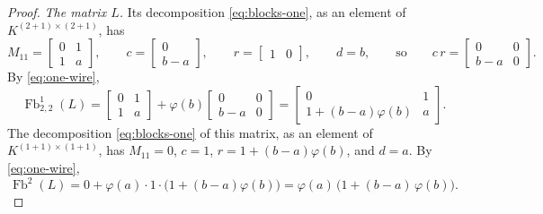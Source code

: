 \documentclass[11pt,a4paper]{article}
\theoremstyle{plain}
\theoremstyle{definition}
\theoremstyle{remark}
\DeclareMathOperator{\Fb}{Fb}
\begin{document}
\begin{proof}
    \emph{The matrix $L$.}
    Its decomposition \cref{eq:blocks-one}, as an element of $K^{(2+1) \times (2+1)}$, has
    \begin{equation*}
        M_{11} = \begin{bmatrix} 0 & 1 \\ 1 & a \end{bmatrix},
        \qquad
        c = \begin{bmatrix} 0 \\ b - a \end{bmatrix},
        \qquad
        r = \begin{bmatrix} 1 & 0 \end{bmatrix},
        \qquad
        d = b,
        \qquad \text{so} \qquad
        c\, r = \begin{bmatrix} 0 & 0 \\ b - a & 0 \end{bmatrix} .
    \end{equation*}
    By \cref{eq:one-wire},
    \begin{equation*}
        \Fb^1_{2,2}(L) = \begin{bmatrix} 0 & 1 \\ 1 & a \end{bmatrix} + \varphi(b) \begin{bmatrix} 0 & 0 \\ b - a & 0 \end{bmatrix}
        = \begin{bmatrix} 0 & 1 \\ 1 + (b - a) \varphi(b) & a \end{bmatrix} .
    \end{equation*}
    The decomposition \cref{eq:blocks-one} of this matrix, as an element of $K^{(1+1) \times (1+1)}$, has $M_{11} = 0$, $c = 1$, $r = 1 + (b - a) \varphi(b)$, and $d = a$.
    By \cref{eq:one-wire},
    \begin{equation}
        \label{eq:Fb-L}
        \Fb^2(L) = 0 + \varphi(a) \cdot 1 \cdot \bigl( 1 + (b - a) \varphi(b) \bigr) = \varphi(a)\, \bigl( 1 + (b - a)\, \varphi(b) \bigr) .
    \end{equation}


\end{proof}
\end{document}
